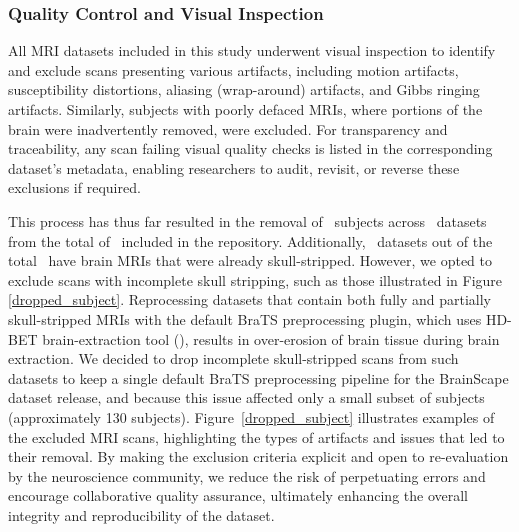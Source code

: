 \subsubsection{Quality Control and Visual Inspection}

All MRI datasets included in this study underwent visual inspection to identify and exclude scans presenting various artifacts, 
including motion artifacts, susceptibility distortions, aliasing (wrap-around) artifacts, and Gibbs ringing artifacts. 
Similarly, subjects with poorly defaced MRIs, where portions of the brain were inadvertently removed, were excluded. For transparency and 
traceability, any scan failing visual quality checks is listed in the corresponding dataset's metadata, enabling researchers to audit, 
revisit, or reverse these exclusions if required.

This process has thus far resulted in the removal of \TotalNumSubjectsRemoved\ subjects across \TotalNumDatasetsWithSubjectsRemoved\ datasets 
from the total of \NumDatasets\ included in the repository. 
Additionally, \NumDatasetsAlreadySkullStripped\ datasets out of the total \NumDatasets\ have brain MRIs that were already skull-stripped. 
However, we opted to exclude scans with incomplete skull stripping, such as those illustrated in Figure \ref{dropped_subject}. 
Reprocessing datasets that contain both fully and partially skull-stripped MRIs with the default BraTS preprocessing plugin, 
which uses HD-BET brain-extraction tool (\cite{isensee2019automated}), results in over-erosion of brain tissue during brain extraction.
We decided to drop incomplete skull-stripped scans from such datasets to keep a single default BraTS preprocessing pipeline for the BrainScape dataset release, 
and because this issue affected only a small subset of subjects (approximately 130 subjects).
Figure~\ref{dropped_subject} illustrates examples of the excluded MRI scans, highlighting the types of artifacts and issues that led to their removal. By making the exclusion 
criteria explicit and open to re-evaluation by the neuroscience community, we reduce the risk of perpetuating errors and encourage collaborative quality assurance, 
ultimately enhancing the overall integrity and reproducibility of the dataset.


